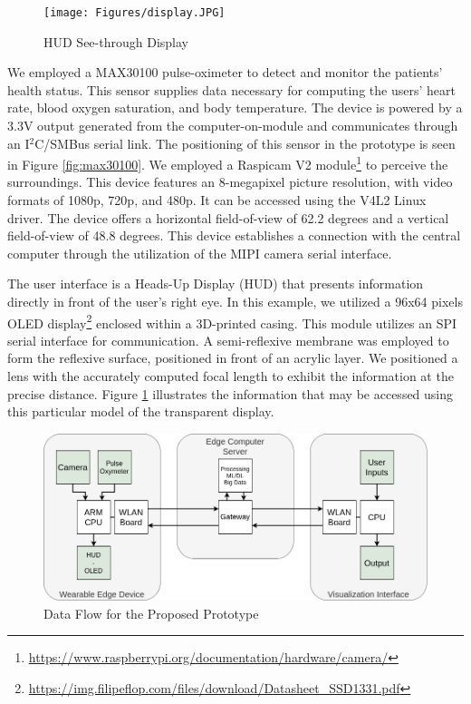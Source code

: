 \begin{figure}[h!]
    \centering
    \texttt{[image: Figures/display.JPG]}
    \caption{HUD See-through Display}
    \label{fig:display}
\end{figure}

We employed a MAX30100 pulse-oximeter to detect and monitor the patients' health status. This sensor supplies data necessary for computing the users' heart rate, blood oxygen saturation, and body temperature. The device is powered by a 3.3V output generated from the computer-on-module and communicates through an I$^2$C/SMBus serial link. The positioning of this sensor in the prototype is seen in Figure \ref{fig:max30100}. We employed a Raspicam V2 module\footnote{\url{https://www.raspberrypi.org/documentation/hardware/camera/}} to perceive the surroundings. This device features an 8-megapixel picture resolution, with video formats of 1080p, 720p, and 480p. It can be accessed using the V4L2 Linux driver. The device offers a horizontal field-of-view of 62.2 degrees and a vertical field-of-view of 48.8 degrees. This device establishes a connection with the central computer through the utilization of the MIPI camera serial interface.

The user interface is a Heads-Up Display (HUD) that presents information directly in front of the user's right eye. In this example, we utilized a 96x64 pixels OLED display\footnote{\url{https://img.filipeflop.com/files/download/Datasheet\_SSD1331.pdf}} enclosed within a 3D-printed casing. This module utilizes an SPI serial interface for communication. A semi-reflexive membrane was employed to form the reflexive surface, positioned in front of an acrylic layer. We positioned a lens with the accurately computed focal length to exhibit the information at the precise distance. Figure \ref{fig:display} illustrates the information that may be accessed using this particular model of the transparent display.

\begin{figure}[ht!]
    \centering
    \includegraphics[width = .7\linewidth]{Figures/dataflow.png}
    \caption{Data Flow for the Proposed Prototype}
    \label{fig:dataflow}
\end{figure}

